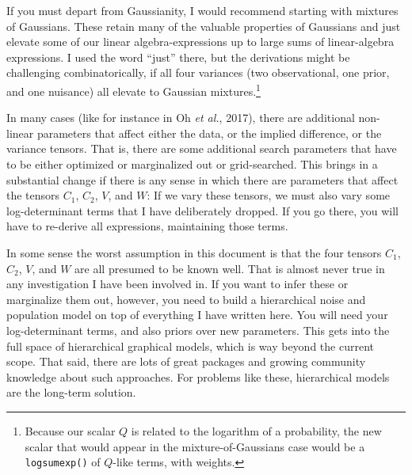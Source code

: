 \documentclass[12pt,letterpaper]{article}
\newcommand{\foreign}[1]{\textsl{#1}}
\newcommand{\code}[1]{{\texttt{#1}}}
\newcommand{\etal}{\foreign{et al.}}
\begin{document}
If you must depart from Gaussianity, I would recommend starting with
mixtures of Gaussians. These retain many of the valuable properties of
Gaussians and just elevate some of our linear algebra-expressions up
to large sums of linear-algebra expressions. I used the word ``just''
there, but the derivations might be challenging combinatorically, if
all four variances (two observational, one prior, and one nuisance)
all elevate to Gaussian mixtures.\footnote{Because our scalar $Q$ is
  related to the logarithm of a probability, the new scalar that would
  appear in the mixture-of-Gaussians case would be a \code{logsumexp()}
  of $Q$-like terms, with weights.}

In many cases (like for instance in Oh \etal, 2017), there are
additional non-linear parameters that affect either the data, or the
implied difference, or the variance tensors. That is, there are some
additional search parameters that have to be either optimized or
marginalized out or grid-searched. This brings in a substantial change
if there is any sense in which there are parameters that affect the
tensors $C_1$, $C_2$, $V$, and $W$: If we vary these tensors, we must
also vary some log-determinant terms that I have deliberately
dropped. If you go there, you will have to re-derive all expressions,
maintaining those terms.

In some sense the worst assumption in this document is that the four
tensors $C_1$, $C_2$, $V$, and $W$ are all presumed to be known well.
That is almost never true in any investigation I have been involved
in.  If you want to infer these or marginalize them out, however, you
need to build a hierarchical noise and population model on top of
everything I have written here. You will need your log-determinant
terms, and also priors over new parameters. This gets into the full
space of hierarchical graphical models, which is way beyond the
current scope. That said, there are lots of great packages and growing
community knowledge about such approaches. For problems like these,
hierarchical models are the long-term solution.

\newcommand{\arXiv}[1]{\href{http://arxiv.org/abs/#1}{\textsl{arXiv}:#1}}
\end{document}

